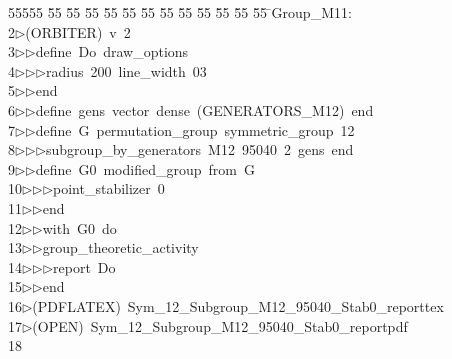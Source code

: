%
%
\begin{tabbing}
55555 \= 55 \= 55 \= 55 \= 55 \= 55 \= 55 \= 55 \= 55 \= 55 \= 55 \= 55 \= 55 \= \>Group\_M11:\\[0pt]
2\>$\triangleright$\>(ORBITER)\ v\ 2\ \\[0pt]
3\>$\triangleright$\>$\triangleright$\>define\ Do\ draw\_options\ \\[0pt]
4\>$\triangleright$\>$\triangleright$\>$\triangleright$\>radius\ 200\ line\_width\ 03\ \\[0pt]
5\>$\triangleright$\>$\triangleright$\>end\ \\[0pt]
6\>$\triangleright$\>$\triangleright$\>define\ gens\ vector\ dense\ (GENERATORS\_M12)\ end\ \\[0pt]
7\>$\triangleright$\>$\triangleright$\>define\ G\ permutation\_group\ symmetric\_group\ 12\ \\[0pt]
8\>$\triangleright$\>$\triangleright$\>$\triangleright$\>subgroup\_by\_generators\ M12\ 95040\ 2\ gens\ end\ \\[0pt]
9\>$\triangleright$\>$\triangleright$\>define\ G0\ modified\_group\ from\ G\ \\[0pt]
10\>$\triangleright$\>$\triangleright$\>$\triangleright$\>point\_stabilizer\ 0\ \\[0pt]
11\>$\triangleright$\>$\triangleright$\>end\ \\[0pt]
12\>$\triangleright$\>$\triangleright$\>with\ G0\ do\ \\[0pt]
13\>$\triangleright$\>$\triangleright$\>group\_theoretic\_activity\ \\[0pt]
14\>$\triangleright$\>$\triangleright$\>$\triangleright$\>report\ Do\ \\[0pt]
15\>$\triangleright$\>$\triangleright$\>end\\[0pt]
16\>$\triangleright$\>(PDFLATEX)\ Sym\_12\_Subgroup\_M12\_95040\_Stab0\_reporttex\\[0pt]
17\>$\triangleright$\>(OPEN)\ Sym\_12\_Subgroup\_M12\_95040\_Stab0\_reportpdf\\[0pt]
18\>\end{tabbing}
